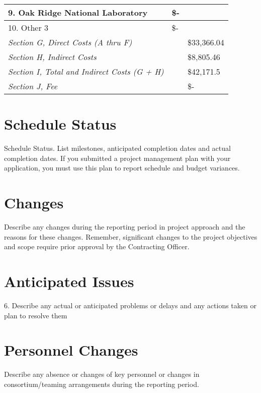 \documentclass[12pt]{article}
\begin{document}
\begin{table}
\begin{center}
\begin{tabular}{ | l | l | l | }
	9. Oak Ridge National Laboratory &  \$-    & \  \\ \hline
	10. Other 3 &  \$-    & \  \\ \hline
	\textit{Section G, Direct Costs (A thru F)} &  & \$33,366.04 \\ \hline
	\textit{Section H, Indirect Costs} &  & \$8,805.46 \\ \hline
	\textit{Section I, Total and Indirect Costs (G + H)} &  & \$42,171.5 \\ \hline
	\textit{Section J, Fee }&  &  \$-    \\ \hline
\end{tabular}
\label{tab:differences}
\end{center}
\end{table}



\section{Schedule Status}
\label{sect::schedule}
Schedule Status.  List milestones, anticipated completion dates and actual completion dates.  If you submitted a project management plan with your application, you must use this plan to report schedule and budget variances.   

\section{Changes}
\label{sect::changes}
Describe any changes during the reporting period in project approach and the reasons for these changes.  Remember, significant changes to the project objectives and scope require prior approval by the Contracting Officer. 

\section{Anticipated Issues}
\label{sect::schedule}
6.	Describe any actual or anticipated problems or delays and any actions taken or plan to resolve them 

\section{Personnel Changes}
\label{sect::personnel}
Describe any absence or changes of key personnel or changes in consortium/teaming arrangements during the reporting period. 
\end{document}
